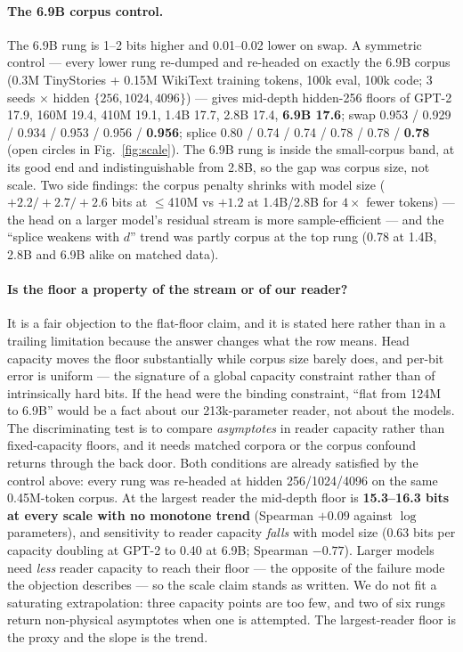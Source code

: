 \documentclass[10pt,twocolumn]{article}
\begin{document}
\paragraph{The 6.9B corpus control.} The 6.9B rung is 1--2 bits higher and 0.01--0.02 lower on
swap. A symmetric control --- every lower rung re-dumped and re-headed on exactly the 6.9B corpus
(0.3M TinyStories + 0.15M WikiText training tokens, 100k eval, 100k code; 3 seeds $\times$ hidden
$\{256,1024,4096\}$) --- gives mid-depth hidden-256 floors of GPT-2 17.9, 160M 19.4, 410M 19.1,
1.4B 17.7, 2.8B 17.4, \textbf{6.9B 17.6}; swap 0.953 / 0.929 / 0.934 / 0.953 / 0.956 /
\textbf{0.956}; splice 0.80 / 0.74 / 0.74 / 0.78 / 0.78 / \textbf{0.78} (open circles in
Fig.~\ref{fig:scale}). The 6.9B rung is inside the small-corpus band, at its good end and
indistinguishable from 2.8B, so the gap was corpus size, not scale. Two side findings: the
corpus penalty shrinks with model size ($+2.2/+2.7/+2.6$ bits at $\le$410M vs $+1.2$ at 1.4B/2.8B
for $4\times$ fewer tokens) --- the head on a larger model's residual stream is more
sample-efficient --- and the ``splice weakens with $d$'' trend was partly corpus at the top rung
(0.78 at 1.4B, 2.8B and 6.9B alike on matched data).



\paragraph{Is the floor a property of the stream or of our reader?} It is a fair
objection to the flat-floor claim, and it is stated here rather than in a trailing
limitation because the answer changes what the row means. Head capacity moves the floor
substantially while corpus size barely does, and per-bit error is uniform --- the
signature of a global capacity constraint rather than of intrinsically hard bits. If
the head were the binding constraint, ``flat from 124M to 6.9B'' would be a fact about
our 213k-parameter reader, not about the models. The discriminating test is to compare
\emph{asymptotes} in reader capacity rather than fixed-capacity floors, and it needs
matched corpora or the corpus confound returns through the back door. Both conditions
are already satisfied by the control above: every rung was re-headed at hidden
256/1024/4096 on the same 0.45M-token corpus. At the largest reader the mid-depth floor
is \textbf{15.3--16.3 bits at every scale with no monotone trend} (Spearman $+0.09$
against $\log$ parameters), and sensitivity to reader capacity \emph{falls} with model
size (0.63 bits per capacity doubling at GPT-2 to 0.40 at 6.9B; Spearman $-0.77$).
Larger models need \emph{less} reader capacity to reach their floor --- the opposite of
the failure mode the objection describes --- so the scale claim stands as written. We
do not fit a saturating extrapolation: three capacity points are too few, and two of
six rungs return non-physical asymptotes when one is attempted. The largest-reader
floor is the proxy and the slope is the trend.
\end{document}
